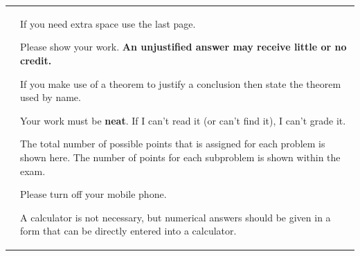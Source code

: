 \documentclass[9pt,addpoints]{exam}
\begin{document}
\vfill

\begin{tabular}{p{8cm}m{8cm}}
  \gradetable[v][questions]
  &
    \begin{nagging}
    \item If you need extra space use the last page.

    \item Please show your work. \textbf{An unjustified answer may receive
        little or no credit.}

    \item If you make use of a theorem to justify a conclusion then
      state the theorem used by name.

    \item Your work must be {\bf neat}. If I can't read it (or can't
      find it), I can't grade it.

    \item The total number of possible points that is assigned for
      each problem is shown here.  The number of points for each
      subproblem is shown within the exam.

    \item Please turn off your mobile phone.


    \item A calculator is not necessary, but numerical answers should
      be given in a form that can be directly entered into a
      calculator.



    \end{nagging}
\end{tabular}

\vfill





\clearpage 



\clearpage
\end{document}
